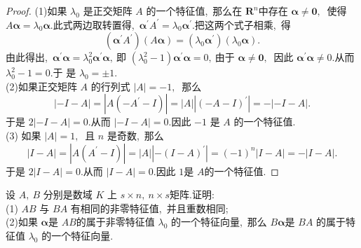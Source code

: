 \begin{proof}
	(1)如果  $\lambda_{0} $ 是正交矩阵 $ A $ 的一个特征值,\  那么在 $ \mathbf{R}^{n}  $中存在 $ \boldsymbol{\alpha} \neq \mathbf{0} ,\ $ 使得 $ A \boldsymbol{\alpha}=   \lambda_{0} \boldsymbol{\alpha} .$此式两边取转置得,\  $ \boldsymbol{\alpha}^{\prime} A^{\prime}=\lambda_{0} \boldsymbol{\alpha}^{\prime}  .$把这两个式子相乘,\  得
	$$\left(\boldsymbol{\alpha}^{\prime} A^{\prime}\right)(A \boldsymbol{\alpha})=\left(\lambda_{0} \boldsymbol{\alpha}^{\prime}\right)\left(\lambda_{0} \boldsymbol{\alpha}\right) .$$
	由此得出,\   $\boldsymbol{\alpha}^{\prime} \boldsymbol{\alpha}=\lambda_{0}^{2} \boldsymbol{\alpha}^{\prime} \boldsymbol{\alpha} ,\  $即  $\left(\lambda_{0}^{2}-1\right) \boldsymbol{\alpha}^{\prime} \boldsymbol{\alpha}=0 ,\  $由于 $ \boldsymbol{\alpha} \neq \boldsymbol{0} ,\ $ 因此 $ \boldsymbol{\alpha}^{\prime} \boldsymbol{\alpha} \neq 0 . $从而  $\lambda_{0}^{2}-1=0 .$于 是  $\lambda_{0}=\pm 1. $\\
	(2)如果正交矩阵 $ A $ 的行列式 $ |A|=-1 ,\ $ 那么
	$$|-I-A|=\left|A\left(-A^{\prime}-I\right)\right|=|A|\left|(-A-I)^{\prime}\right|=-|-I-A| .$$
	于是 $ 2|-I-A|=0  .$从而  $|-I-A|=0  .$因此 $ -1 $ 是  $A $ 的一个特征值.\\
	(3) 如果  $|A|=1 ,\ $ 且 $ n $ 是奇数,\ 那么
	$$|I-A|=\left|A\left(A^{\prime}-I\right)\right|=|A|\left|-(I-A)^{\prime}\right|=(-1)^{n}|I-A|=-|I-A| .$$
	于是 $ 2|I-A|=0 .$从而 $ |I-A|=0  .$因此 $1 $是  $A  $的一个特征值.
\end{proof}
\newpage
\begin{problem}
	设 $ A ,\  B $ 分别是数域 $ K $ 上 $ s \times n ,\  n \times s  $矩阵.证明:\\
	(1) $ A B $ 与  $B A$  有相同的非零特征值,\  并且重数相同;\\
	(2)如果  $\boldsymbol{\alpha}  $是 $ A B  $的属于非零特征值  $\lambda_{0}$  的一个特征向量,\ 那么 $ B \boldsymbol{\alpha}  $是 $ B A$  的属于特 征值  $\lambda_{0} $ 的一个特征向量.
\end{problem}
